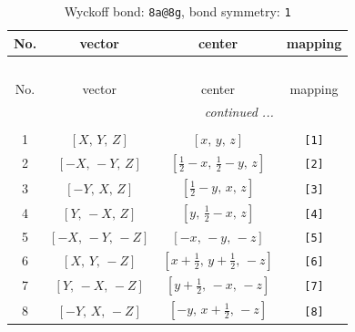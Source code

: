 \documentclass[fleqn,8pt]{jsarticle}
\begin{document}
\begin{longtable}{cccc}
\caption{Wyckoff bond: {\tt 8a@8g}, bond symmetry: {\tt 1}}
 \\
 \hline \hline
No. & vector & center & mapping \\ \hline \endfirsthead

\multicolumn{3}{l}{\tablename\ \thetable{}} \\
 \hline \hline
No. & vector & center & mapping \\ \hline \endhead

 \hline \hline
\multicolumn{3}{r}{\footnotesize\it continued ...} \\ \endfoot

 \hline \hline
\multicolumn{3}{r}{} \\ \endlastfoot

1 & $\left[ X,\, Y,\, Z \right]$ & $\left[ x,\, y,\, z \right]$ & {\tt [1]} \\ \hline
2 & $\left[ - X,\, - Y,\, Z \right]$ & $\left[ \frac{1}{2} - x,\, \frac{1}{2} - y,\, z \right]$ & {\tt [2]} \\ \hline
3 & $\left[ - Y,\, X,\, Z \right]$ & $\left[ \frac{1}{2} - y,\, x,\, z \right]$ & {\tt [3]} \\ \hline
4 & $\left[ Y,\, - X,\, Z \right]$ & $\left[ y,\, \frac{1}{2} - x,\, z \right]$ & {\tt [4]} \\ \hline
5 & $\left[ - X,\, - Y,\, - Z \right]$ & $\left[ - x,\, - y,\, - z \right]$ & {\tt [5]} \\ \hline
6 & $\left[ X,\, Y,\, - Z \right]$ & $\left[ x + \frac{1}{2},\, y + \frac{1}{2},\, - z \right]$ & {\tt [6]} \\ \hline
7 & $\left[ Y,\, - X,\, - Z \right]$ & $\left[ y + \frac{1}{2},\, - x,\, - z \right]$ & {\tt [7]} \\ \hline
8 & $\left[ - Y,\, X,\, - Z \right]$ & $\left[ - y,\, x + \frac{1}{2},\, - z \right]$ & {\tt [8]} \\
\end{longtable}
\end{document}

